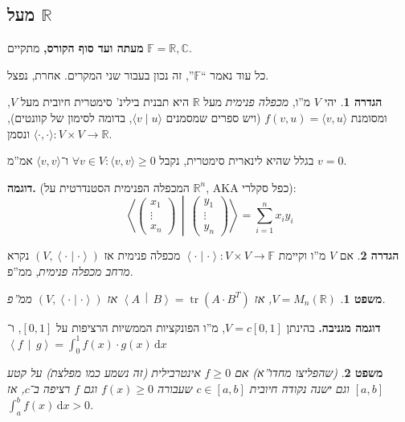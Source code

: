 \documentclass[]{article}
\newcommand\R     {\mathbb{R}}
\newcommand\C     {\mathbb{C}}
\newcommand\ra    {\rangle}
\newcommand\la    {\langle}
\DeclareMathOperator{\tr}     {tr}
\newcommand\dx    {\,\mathrm{d}x}
\newcommand\F         {\mathbb{F}}
\newcommand\co        {\colon}
\newcommand\pms[1]    {\begin{pmatrix}
        #1
\end{pmatrix}}
\newcommand\mut[2]    {\left \la #1 \,\middle\vert\, #2 \right \ra}
\newcommand\smut      {\left \la \cdot \mid \cdot \right \ra}
\newtheorem{Theorem}{משפט}
\theoremstyle{definition}
\newtheorem{definition}{הגדרה}
\newcommand\theo  [1] {\begin{Theorem}#1\end{Theorem}}
\newcommand\defi  [1] {\begin{definition}#1\end{definition}}
\begin{document}
    \subsection{מעל $\R$}
    \textbf{מעתה ועד סוף הקורס, }מתקיים $\F = \R, \C$. 
    
    כל עוד נאמר ``$\F$'', זה נכון בעבור שני המקרים. אחרת, נפצל. 
    
    \defi{יהי $V$ מ''ו, \textit{מכפלה פנימית} מעל $\R$ היא תבנית בילינ' סימטרית חיובית מעל $V$, ומסומנת $f(v, u) = \la v, u \ra$ (ויש ספרים שמסמנים $\la v \mid u \ra$, בדומה לסימון של קוונטים), ונסמן $\la \cdot, \cdot \ra\co V \times V \to \R$. }
    
    בגלל שהיא לינארית סימטרית, נקבל $\forall v \in V \co \la v, v \ra \ge 0$ ו־$\la v, v \ra$ אמ''מ $v = 0$. 
    
    \textbf{דוגמה. }(המכפלה הפנימית הסטנדרטית על $\R^n$, AKA כפל סקלרי): 
    \[ \mut{\pms{x_1 \\ \vdots\\ x_n}}{\pms{y_1 \\ \vdots \\ y_n}} = \sum_{i = 1}^{n}x_iy_i \]
    
    \defi{אם $V$ מ''ו וקיימת $\smut \co V \times V \to \F$ מכפלה פנימית אז $(V, \smut)$ נקרא \textit{מרחב מכפלה פנימית}, ממ''פ. }
    
    \theo{$V = M_n(\R)$, אז $\mut{A}{B} = \tr(A \cdot B^T)$ אז $(V, \smut)$ ממ''פ. }
    
    \textbf{דוגמה מגניבה. }בהינתן $V = c[0, 1]$, מ''ו הפונקציות הממשיות הרציפות על $[0, 1]$, ו־$\mut{f}{g} = \int_0^1 f(x) \cdot g(x) \dx$ 
    \theo{(שהפליצו מחדו''א) אם $f \ge 0$ אינטרבילית (זה נשמע כמו מפלצת) על קטע $[a, b]$ וגם ישנה נקודה חיובית $c \in [a, b]$ שעבורה $f(x) \ge 0$ וגם $f$ רציפה ב־$c$, אז $\int^b_a f(x) \dx > 0$. }
    
\end{document}

